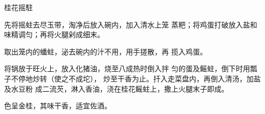 \begin{recipe}{桂花摇駐}

\ingredients


\cooking

\step 先将摇蛀去尽玉带，淘净后放入碗内，加入清水上笼 蒸粑；将鸡蛋打破放入盐和味精调匀；再将火腿剁成细末。

取出笼内的蟠蛀，泌去碗内的汁不用，用手搓散，再 揽入鸡蛋。

\step 将锅放于旺火上，放入化猪油，烧至八成热时倒入拌 匀的蛋及鳐蛀，倒下时用瓢子不停地炒转（使之不成坨）， 炒至干香为止。扦入走菜盘内，再倒入清汤，加盐及水豆粉 成二流芡，淋入香油，浇在桂花鳐蛀上，撒上火腿末子即成。

\notes

色呈金桂，其味干香，适宜佐酒。

\end{recipe}

